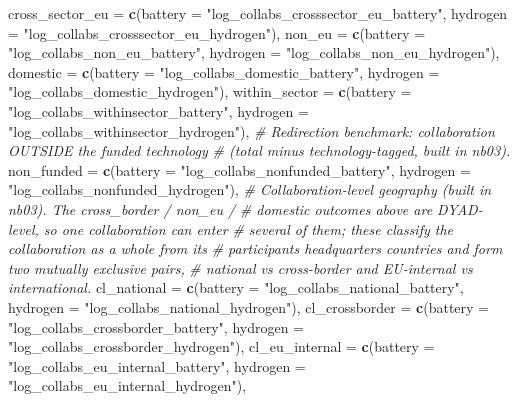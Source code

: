 \documentclass[
]{article}
\newenvironment{Shaded}{\begin{snugshade}}{\end{snugshade}}
\newcommand{\AttributeTok}[1]{\textcolor[rgb]{0.13,0.29,0.53}{#1}}
\newcommand{\CommentTok}[1]{\textcolor[rgb]{0.56,0.35,0.01}{\textit{#1}}}
\newcommand{\FunctionTok}[1]{\textcolor[rgb]{0.13,0.29,0.53}{\textbf{#1}}}
\newcommand{\NormalTok}[1]{#1}
\newcommand{\StringTok}[1]{\textcolor[rgb]{0.31,0.60,0.02}{#1}}
\begin{document}
\begin{Shaded}
\begin{Highlighting}[]
  \AttributeTok{cross\_sector\_eu =} \FunctionTok{c}\NormalTok{(}\AttributeTok{battery =} \StringTok{"log\_collabs\_crosssector\_eu\_battery"}\NormalTok{,}
                      \AttributeTok{hydrogen =} \StringTok{"log\_collabs\_crosssector\_eu\_hydrogen"}\NormalTok{),}
  \AttributeTok{non\_eu =} \FunctionTok{c}\NormalTok{(}\AttributeTok{battery =} \StringTok{"log\_collabs\_non\_eu\_battery"}\NormalTok{,}
             \AttributeTok{hydrogen =} \StringTok{"log\_collabs\_non\_eu\_hydrogen"}\NormalTok{),}
  \AttributeTok{domestic =} \FunctionTok{c}\NormalTok{(}\AttributeTok{battery =} \StringTok{"log\_collabs\_domestic\_battery"}\NormalTok{,}
               \AttributeTok{hydrogen =} \StringTok{"log\_collabs\_domestic\_hydrogen"}\NormalTok{),}
  \AttributeTok{within\_sector =} \FunctionTok{c}\NormalTok{(}\AttributeTok{battery =} \StringTok{"log\_collabs\_withinsector\_battery"}\NormalTok{,}
                    \AttributeTok{hydrogen =} \StringTok{"log\_collabs\_withinsector\_hydrogen"}\NormalTok{),}
  \CommentTok{\# Redirection benchmark: collaboration OUTSIDE the funded technology}
  \CommentTok{\# (total minus technology{-}tagged, built in nb03).}
  \AttributeTok{non\_funded    =} \FunctionTok{c}\NormalTok{(}\AttributeTok{battery =} \StringTok{"log\_collabs\_nonfunded\_battery"}\NormalTok{,}
                    \AttributeTok{hydrogen =} \StringTok{"log\_collabs\_nonfunded\_hydrogen"}\NormalTok{),}
  \CommentTok{\# Collaboration{-}level geography (built in nb03). The cross\_border / non\_eu /}
  \CommentTok{\# domestic outcomes above are DYAD{-}level, so one collaboration can enter}
  \CommentTok{\# several of them; these classify the collaboration as a whole from its}
  \CommentTok{\# participants\textquotesingle{} headquarters countries and form two mutually exclusive pairs,}
  \CommentTok{\# national vs cross{-}border and EU{-}internal vs international.}
  \AttributeTok{cl\_national      =} \FunctionTok{c}\NormalTok{(}\AttributeTok{battery =} \StringTok{"log\_collabs\_national\_battery"}\NormalTok{,}
                       \AttributeTok{hydrogen =} \StringTok{"log\_collabs\_national\_hydrogen"}\NormalTok{),}
  \AttributeTok{cl\_crossborder   =} \FunctionTok{c}\NormalTok{(}\AttributeTok{battery =} \StringTok{"log\_collabs\_crossborder\_battery"}\NormalTok{,}
                       \AttributeTok{hydrogen =} \StringTok{"log\_collabs\_crossborder\_hydrogen"}\NormalTok{),}
  \AttributeTok{cl\_eu\_internal   =} \FunctionTok{c}\NormalTok{(}\AttributeTok{battery =} \StringTok{"log\_collabs\_eu\_internal\_battery"}\NormalTok{,}
                       \AttributeTok{hydrogen =} \StringTok{"log\_collabs\_eu\_internal\_hydrogen"}\NormalTok{),}

\end{Highlighting}
\end{Shaded}
\end{document}
